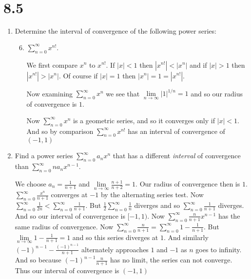 \documentclass[letterpaper]{article}
\begin{document}
\renewcommand{\labelenumi}{\Alph{enumi}.}
\renewcommand{\labelenumii}{(\alph{enumii})}
\section*{8.5}
\begin{enumerate}
\item
Determine the interval of convergence of the following power series:
  \begin{enumerate}
  \setcounter{enumii}{5}
  \item
  $\sum\limits_{n=0}^\infty{x^{n!}}$.

  We first compare $x^n$ to $x^{n!}$. If $|x|<1$ then $|x^{n!}|<|x^n|$ and if $|x|>1$ then $|x^{n!}|>|x^n|$. Of course if $|x|=1$ then $|x^n|=1=|x^{n!}|$.

  Now examining $\sum\limits_{n=0}^\infty{x^n}$ we see that $\lim\limits_{n\to\infty}|1|^{1/n}=1$ and so our radius of convergence is $1$.

  Now $\sum\limits_{n=0}^\infty{x^n}$ is a geometric series, and so it converges only if $|x|<1$. And so by comparison $\sum\limits_{n=0}^\infty{x^{n!}}$ has an interval of convergence of $(-1,1)$
  \end{enumerate}
\item
Find a power series $\sum\limits_{n=0}^\infty{a_nx^n}$ that has a different \emph{interval} of convergence than $\sum\limits_{n=0}^\infty{na_nx^{n-1}}$.

We choose $a_n=\frac{1}{n+1}$ and $\lim\limits_{n\to\infty}\frac{n+1}{n+2}=1$. Our radius of convergence then is $1$. $\sum\limits_{n=0}^\infty{\frac{x^n}{n+1}}$ converges at $-1$ by the alternating series test. Now $\sum\limits_{n=0}^\infty{\frac{1}{2n}}<\sum\limits_{n=0}^\infty{\frac{1}{n+1}}$. But $\frac{1}{2}\sum\limits_{n=0}^\infty{\frac{1}{n}}$ diverges and so $\sum\limits_{n=0}^\infty{\frac{1}{n+1}}$ diverges. And so our interval of convergence is $[-1,1)$. Now $\sum\limits_{n=0}^\infty{\frac{n}{n+1}x^{n-1}}$ has the same radius of convergence. Now $\sum\limits_{n=0}^\infty{\frac{n}{n+1}}=\sum\limits_{n=0}^\infty{1-\frac{1}{n+1}}$. But $\lim\limits_{n\to\infty}1-\frac{1}{n+1}=1$ and so this series diverges at $1$. And similarly $(-1)^{n-1}-\frac{(-1)^{n-1}}{n+1}$ alternately approaches $1$ and $-1$ as $n$ goes to infinity. And so because $(-1)^{n-1}\frac{n}{n+1}$ has no limit, the series can not converge. Thus our interval of convergence is $(-1,1)$
\end{enumerate}
\end{document}
